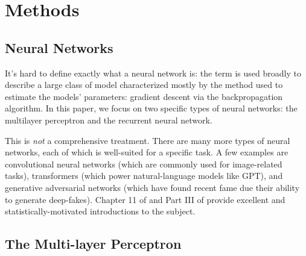 \section{Methods}
\label{sec:methods}

%
%
%
%
%
%

\subsection{Neural Networks}

It's hard to define exactly what a neural network is: the term is used broadly to describe a large class of model characterized mostly by the method used to estimate the models' parameters: gradient descent via the backpropagation algorithm. In this paper, we focus on two specific types of neural networks: the multilayer perceptron and the recurrent neural network.

This is \emph{not} a comprehensive treatment. There are many more types of neural networks, each of which is well-suited for a specific task. A few examples are convolutional neural networks (which are commonly used for image-related tasks), transformers (which power natural-language models like GPT), and generative adversarial networks (which have found recent fame due their ability to generate deep-fakes). Chapter 11 of \textcite{ESL} and Part III of \textcite{PML} provide excellent and statistically-motivated introductions to the subject.

\subsection{The Multi-layer Perceptron}

